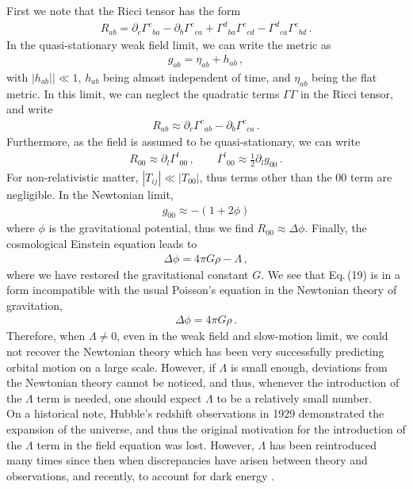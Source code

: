 \documentclass[11pt]{article}
\theoremstyle{break}
\theoremstyle{break}
\newcommand{\pd}{\partial}
\begin{document}
First we note that the Ricci tensor has the form
\begin{align}
R_{ab} = \pd_c \Gamma^c {}_{ba} - \pd_b \Gamma^c{}_{c a} + \Gamma^{d}{}_{ba} \Gamma^{c}{}_{c d} - \Gamma^d{}_{ca} \Gamma^{c}{}_{bd}\,.
\end{align}
In the quasi-stationary weak field limit, we can write the metric as
\begin{align}
g_{ab} = \eta_{ab}+ h_{ab}\,,
\end{align}
with $|h_{ab}||\ll 1$, $h_{ab}$ being almost independent of time, and $\eta_{ab}$ being the flat metric. In this limit, we can neglect the quadratic terms $\Gamma\Gamma$ in the Ricci tensor, and write
\begin{align}
R_{ab} \approx \pd_c \Gamma^c{}_{ab} - \pd_b \Gamma^c{}_{ca}\,.
\end{align}
Furthermore, as the field is assumed to be quasi-stationary, we can write
\begin{align}
R_{00} \approx \pd_l \Gamma^l{}_{00} \,,\qquad
\Gamma^{l}{}_{00} \approx \frac{1}{2}\pd_l g_{00}\,.
\end{align}
For non-relativistic matter, $|T_{ij}|\ll |T_{00}|$, thus terms other than the $00$ term are negligible. In the Newtonian limit, 
\begin{align}
g_{00}\approx -(1+ 2\phi)
\end{align}
where $\phi$ is the gravitational potential, thus we find $R_{00} \approx \Delta \phi$. Finally, the cosmological Einstein equation leads to 
\begin{align}
\Delta \phi = 4\pi G \rho - \Lambda\,,
\end{align}
where we have restored the gravitational constant $G$. We see that Eq.\,(19) is in a form incompatible with the usual Poisson's equation in the Newtonian theory of gravitation,
\begin{align}
\Delta \phi = 4\pi G\rho\,.
\end{align}
Therefore, when $\Lambda \neq 0$, even in the weak field and slow-motion limit, we could not recover the Newtonian theory which has been very successfully predicting orbital motion on a large scale. However, if $\Lambda$ is small enough, deviations from the Newtonian theory cannot be noticed, and thus, whenever the introduction of the $\Lambda$ term is needed, one should expect $\Lambda$ to be a relatively small number. \\

On a historical note, Hubble's redshift observations in 1929 demonstrated the expansion of the universe, and thus the original motivation for the introduction of the $\Lambda$ term in the field equation was lost. However, $\Lambda$ has been reintroduced many times since then when discrepancies have arisen between theory and observations, and recently, to account for dark energy \cite{Wald}.
\end{document}
